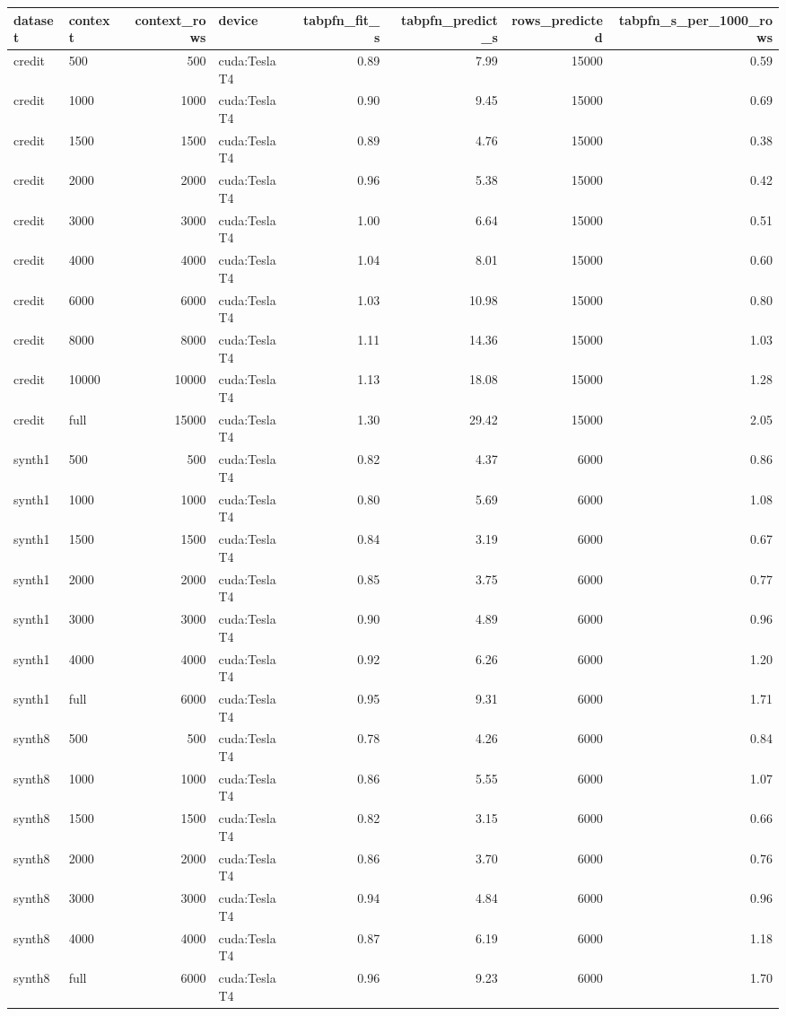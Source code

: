 \begin{tabular}{llrlrrrr}
\toprule
dataset & context & context_rows & device & tabpfn_fit_s & tabpfn_predict_s & rows_predicted & tabpfn_s_per_1000_rows \\
\midrule
credit & 500 & 500 & cuda:Tesla T4 & 0.89 & 7.99 & 15000 & 0.59 \\
credit & 1000 & 1000 & cuda:Tesla T4 & 0.90 & 9.45 & 15000 & 0.69 \\
credit & 1500 & 1500 & cuda:Tesla T4 & 0.89 & 4.76 & 15000 & 0.38 \\
credit & 2000 & 2000 & cuda:Tesla T4 & 0.96 & 5.38 & 15000 & 0.42 \\
credit & 3000 & 3000 & cuda:Tesla T4 & 1.00 & 6.64 & 15000 & 0.51 \\
credit & 4000 & 4000 & cuda:Tesla T4 & 1.04 & 8.01 & 15000 & 0.60 \\
credit & 6000 & 6000 & cuda:Tesla T4 & 1.03 & 10.98 & 15000 & 0.80 \\
credit & 8000 & 8000 & cuda:Tesla T4 & 1.11 & 14.36 & 15000 & 1.03 \\
credit & 10000 & 10000 & cuda:Tesla T4 & 1.13 & 18.08 & 15000 & 1.28 \\
credit & full & 15000 & cuda:Tesla T4 & 1.30 & 29.42 & 15000 & 2.05 \\
synth1 & 500 & 500 & cuda:Tesla T4 & 0.82 & 4.37 & 6000 & 0.86 \\
synth1 & 1000 & 1000 & cuda:Tesla T4 & 0.80 & 5.69 & 6000 & 1.08 \\
synth1 & 1500 & 1500 & cuda:Tesla T4 & 0.84 & 3.19 & 6000 & 0.67 \\
synth1 & 2000 & 2000 & cuda:Tesla T4 & 0.85 & 3.75 & 6000 & 0.77 \\
synth1 & 3000 & 3000 & cuda:Tesla T4 & 0.90 & 4.89 & 6000 & 0.96 \\
synth1 & 4000 & 4000 & cuda:Tesla T4 & 0.92 & 6.26 & 6000 & 1.20 \\
synth1 & full & 6000 & cuda:Tesla T4 & 0.95 & 9.31 & 6000 & 1.71 \\
synth8 & 500 & 500 & cuda:Tesla T4 & 0.78 & 4.26 & 6000 & 0.84 \\
synth8 & 1000 & 1000 & cuda:Tesla T4 & 0.86 & 5.55 & 6000 & 1.07 \\
synth8 & 1500 & 1500 & cuda:Tesla T4 & 0.82 & 3.15 & 6000 & 0.66 \\
synth8 & 2000 & 2000 & cuda:Tesla T4 & 0.86 & 3.70 & 6000 & 0.76 \\
synth8 & 3000 & 3000 & cuda:Tesla T4 & 0.94 & 4.84 & 6000 & 0.96 \\
synth8 & 4000 & 4000 & cuda:Tesla T4 & 0.87 & 6.19 & 6000 & 1.18 \\
synth8 & full & 6000 & cuda:Tesla T4 & 0.96 & 9.23 & 6000 & 1.70 \\
\bottomrule
\end{tabular}
